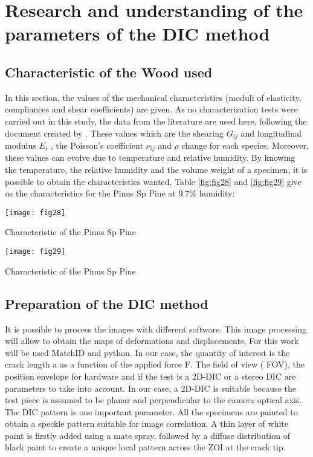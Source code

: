 \section{Research and understanding of the parameters of the DIC method}

\subsection{Characteristic of the Wood used}

In this section, the values of the mechanical characteristics (moduli of elasticity, compliances and shear coefficients) are given. As no characterization tests were carried out in this study, the data from the literature are used here, following the document created by \cite{Reference20}. These values which are the shearing $G_{ij}$ and longitudinal modulus $E_i$ , the Poisson’s coefficient $\nu_{ij}$ and $\rho$ change for each species. Moreover, these values can evolve due to temperature and relative humidity. By knowing the temperature, the relative humidity and the volume weight of a specimen, it is possible to obtain the characteristics wanted. Table \ref{fig:fig28} and \ref{fig:fig29} give us the characteristics for the Pinus Sp Pine at 9.7$\%$ humidity:

\graphicspath{{Images/}}
\begin{table}[htp]
	\centering
	\texttt{[image: fig28]}
	\caption{Characteristic of the Pinus Sp Pine}
	\label{fig:fig28}
\end{table}

\graphicspath{{Images/}}
\begin{table}[htp]
	\centering
	\texttt{[image: fig29]}
	\caption{Characteristic of the Pinus Sp Pine}
	\label{fig:fig29}
\end{table}

\subsection{Preparation of the DIC method}

It is possible to process the images with different software. This image processing will allow to obtain the maps of deformations and displacements. For this work will be used MatchID and python. In our case, the quantity of interest is the crack length a as a function of the applied force F. The field of view ( FOV), the position envelope for hardware and if the test is a 2D-DIC or a stereo DIC are parameters to take into account. In our case, a 2D-DIC is suitable because the test piece is assumed to be planar and perpendicular to the camera optical axis. The DIC pattern is one important parameter. All the specimens are painted to obtain a speckle pattern suitable for image correlation. A thin layer of white paint is firstly added using a mate spray, followed by a diffuse distribution of black paint to create a unique local pattern across the ZOI at the crack tip.

